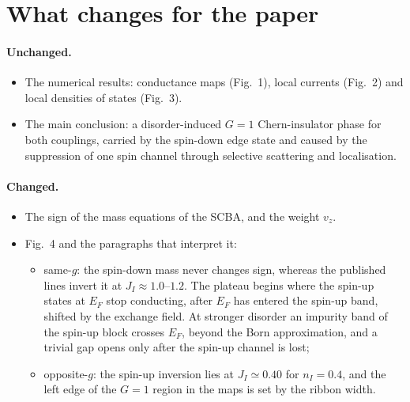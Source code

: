 \documentclass[11pt,a4paper]{article}
\begin{document}
\section{What changes for the paper}\label{s:addendum}

\paragraph{Unchanged.}
\begin{itemize}
\item The numerical results: conductance maps (Fig.~1), local currents (Fig.~2) and local
  densities of states (Fig.~3).
\item The main conclusion: a disorder-induced $G=1$ Chern-insulator phase for both couplings,
  carried by the spin-down edge state and caused by the suppression of one spin channel through
  selective scattering and localisation.
\end{itemize}

\paragraph{Changed.}
\begin{itemize}
\item The sign of the mass equations of the SCBA, and the weight $v_z$.
\item Fig.~4 and the paragraphs that interpret it:
  \begin{itemize}
  \item same-$g$: the spin-down mass never changes sign, whereas the published lines invert
    it at $J_I\approx1.0$--$1.2$. The plateau begins where the spin-up states at $E_F$ stop
    conducting, after $E_F$ has entered the spin-up band, shifted by the exchange field. At
    stronger disorder an impurity band of the spin-up block crosses $E_F$, beyond the Born
    approximation, and a trivial gap opens only after the spin-up channel is lost;
  \item opposite-$g$: the spin-up inversion lies at $J_I\simeq0.40$ for $n_I=0.4$, and the left
    edge of the $G=1$ region in the maps is set by the ribbon width.
  \end{itemize}
\end{itemize}
\end{document}
